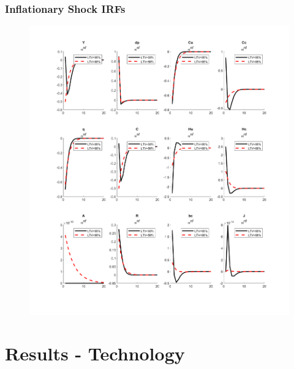 \documentclass{beamer}
\begin{document}
\begin{frame}
	\frametitle{Inflationary Shock IRFs}
	
	\begin{figure}[H]\centering
  \includegraphics[scale=0.3]{_n_inf}
\end{figure}
	
\end{frame}



\section{Results - Technology}
\end{document}
